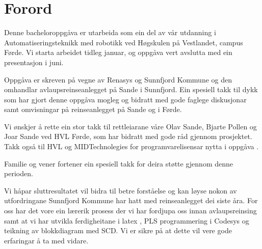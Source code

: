 \chapter{Forord}
\thispagestyle{romanpages}

Denne bacheloroppgåva er utarbeida som ein del av vår utdanning i Automatiseringsteknikk med robotikk ved Høgskulen på Vestlandet, campus Førde.
Vi starta arbeidet tidleg januar, og oppgåva vert avslutta med ein presentasjon i juni.

Oppgåva er skreven på vegne av \gls{Renasys} \citep{Renasys} og \gls{Sunnfjord Kommune} \citep{SunnfjordKommune} og den omhandlar 
avlaupsreinseanlegget på Sande i Sunnfjord. 
Ein spesiell takk til dykk som har gjort denne oppgåva mogleg og
bidratt med gode faglege diskusjonar samt omvisningar på reinseanlegget på Sande og i Førde.

Vi ønskjer å rette ein stor takk til rettleiarane våre Olav Sande, Bjarte Pollen og Joar Sande ved \gls{HVL} Førde, som har bidratt med gode råd gjennom prosjektet.
Takk også til \gls{HVL} \citep{HVL} og MIDTechnolegies \citep{MIDT} for programvarelisensar nytta i oppgåva \citep{MIDTToolbox} \citep{Microsoft}.

Familie og vener fortener ein spesiell takk for deira støtte gjennom denne perioden.

Vi håpar sluttresultatet vil bidra til betre forståelse og kan løyse nokon av utfordringane \gls{Sunnfjord Kommune} har hatt med reinseanlegget dei siste åra.
For oss har det vore ein lærerik prosess der vi har fordjupa oss innan avlaupsreinsing samt at vi har utvikla ferdigheitane i \gls{latex} \citep{MikTeX} \citep{VisualStudio}, 
\gls{PLS} programmering i \gls{Codesys} \citep{Codesys} og teikning av blokkdiagram med \gls{SCD}. Vi er sikre på at dette vil vere gode erfaringar å ta med vidare.
 